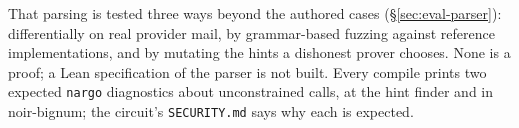 That parsing is tested three ways beyond the authored cases
(\S\ref{sec:eval-parser}): differentially on real provider mail, by
grammar-based fuzzing against reference implementations, and by mutating
the hints a dishonest prover chooses. None is a proof; a Lean specification
of the parser is not built. Every compile prints two expected
\texttt{nargo} diagnostics about unconstrained calls, at the hint finder and
in noir-bignum; the circuit's \texttt{SECURITY.md} says why each is
expected.
